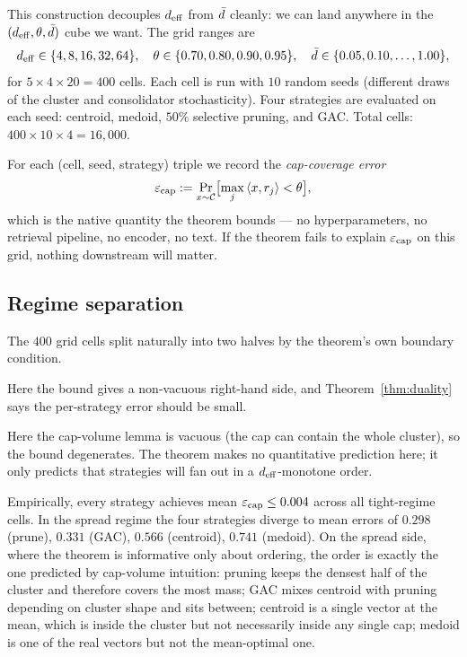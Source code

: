 This construction decouples ${d_{\mathrm{eff}}}$ from $\bar{d}$ cleanly: we can land
anywhere in the $({d_{\mathrm{eff}}}, \theta, \bar{d})$ cube we want. The grid ranges
are
\[
{d_{\mathrm{eff}}} \in \{4, 8, 16, 32, 64\}, \quad
\theta \in \{0.70, 0.80, 0.90, 0.95\}, \quad
\bar{d} \in \{0.05, 0.10, \ldots, 1.00\},
\]
for $5 \times 4 \times 20 = 400$ cells. Each cell is run with $10$
random seeds (different draws of the cluster and consolidator
stochasticity). Four strategies are evaluated on each seed: centroid,
medoid, $50\%$ selective pruning, and GAC. Total cells:
$400 \times 10 \times 4 = 16{,}000$.

For each (cell, seed, strategy) triple we record the \emph{cap-coverage
error}
\begin{equation}
\varepsilon_{\mathrm{cap}} :=
\Pr_{x \sim \mathcal{C}}\bigl[\max_j \left\langle x,r_j\right\rangle < \theta\bigr],
\label{eq:cap_error}
\end{equation}
which is the native quantity the theorem bounds --- no hyperparameters,
no retrieval pipeline, no encoder, no text. If the theorem fails to
explain $\varepsilon_{\mathrm{cap}}$ on this grid, nothing downstream will
matter.

\subsection{Regime separation}
\label{sec:e1:regimes}

The $400$ grid cells split naturally into two halves by the theorem's
own boundary condition.

\begin{description}[leftmargin=1.8em]
\item[Tight regime ($\dbar < \thetap$).] Here the bound gives a
non-vacuous right-hand side, and Theorem~\ref{thm:duality} says the
per-strategy error should be small.
\item[Spread regime ($\dbar \geq \thetap$).] Here the cap-volume lemma
is vacuous (the cap can contain the whole cluster), so the bound
degenerates. The theorem makes no quantitative prediction here; it
only predicts that strategies will fan out in a ${d_{\mathrm{eff}}}$-monotone
order.
\end{description}

Empirically, every strategy achieves mean $\varepsilon_{\mathrm{cap}} \leq 0.004$
across all tight-regime cells. In the spread regime the four strategies
diverge to mean errors of $0.298$ (prune), $0.331$ (GAC), $0.566$
(centroid), $0.741$ (medoid). On the spread side, where the theorem is
informative only about ordering, the order is exactly the one predicted
by cap-volume intuition: pruning keeps the densest half of the cluster
and therefore covers the most mass; GAC mixes centroid with pruning
depending on cluster shape and sits between; centroid is a single vector
at the mean, which is inside the cluster but not necessarily inside any
single cap; medoid is one of the real vectors but not the mean-optimal
one.


